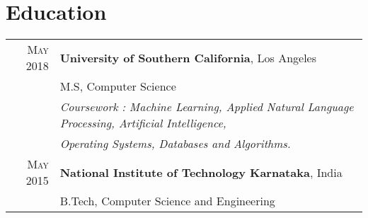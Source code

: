 \section{Education}
\begin{tabular}{rl}

\textsc{May 2018} & \textbf{University of Southern California}, Los Angeles  \hspace{5.0cm} \\
&M.S, Computer Science\\
& \textit{Coursework : Machine Learning, Applied Natural Language Processing, Artificial Intelligence,} \\
& \hspace{2.0cm} \textit {Operating Systems, Databases and Algorithms.}
\vspace{10pt}
\\
\textsc{May 2015} & \textbf{National Institute of Technology Karnataka}, India \hspace{4.0cm} \\
&B.Tech, Computer Science and Engineering
\end{tabular}
